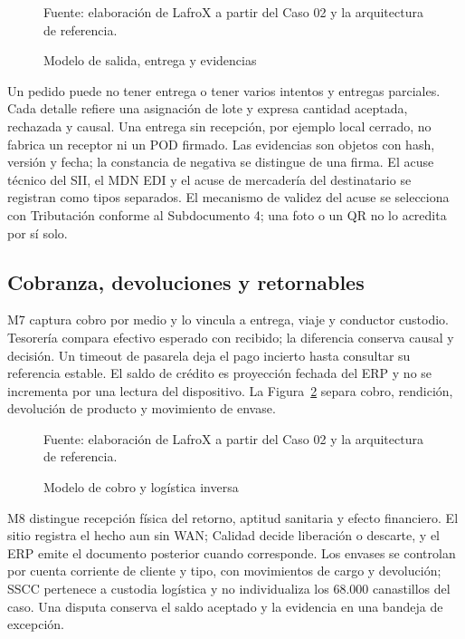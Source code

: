 \begin{figure}[htbp]
\centering

\caption{Modelo de salida, entrega y evidencias}
\label{fig:5-entrega}
{\fontsize{9pt}{11pt}\selectfont Fuente: elaboración de LafroX a partir del Caso 02 y la arquitectura de referencia.}
\end{figure}\FloatBarrier

Un pedido puede no tener entrega o tener varios intentos y entregas parciales. Cada detalle refiere una asignación de lote y expresa cantidad aceptada, rechazada y causal. Una entrega sin recepción, por ejemplo local cerrado, no fabrica un receptor ni un POD firmado. Las evidencias son objetos con hash, versión y fecha; la constancia de negativa se distingue de una firma. El acuse técnico del SII, el MDN EDI y el acuse de mercadería del destinatario se registran como tipos separados. El mecanismo de validez del acuse se selecciona con Tributación conforme al Subdocumento 4; una foto o un QR no lo acredita por sí solo.

\subsection{Cobranza, devoluciones y retornables}
M7 captura cobro por medio y lo vincula a entrega, viaje y conductor custodio. Tesorería compara efectivo esperado con recibido; la diferencia conserva causal y decisión. Un timeout de pasarela deja el pago incierto hasta consultar su referencia estable. El saldo de crédito es proyección fechada del ERP y no se incrementa por una lectura del dispositivo.
La Figura~\ref{fig:5-retornos} separa cobro, rendición, devolución de producto y movimiento de envase.

\begin{figure}[htbp]
\centering

\caption{Modelo de cobro y logística inversa}
\label{fig:5-retornos}
{\fontsize{9pt}{11pt}\selectfont Fuente: elaboración de LafroX a partir del Caso 02 y la arquitectura de referencia.}
\end{figure}\FloatBarrier

M8 distingue recepción física del retorno, aptitud sanitaria y efecto financiero. El sitio registra el hecho aun sin WAN; Calidad decide liberación o descarte, y el ERP emite el documento posterior cuando corresponde. Los envases se controlan por cuenta corriente de cliente y tipo, con movimientos de cargo y devolución; SSCC pertenece a custodia logística y no individualiza los 68.000 canastillos del caso. Una disputa conserva el saldo aceptado y la evidencia en una bandeja de excepción.

